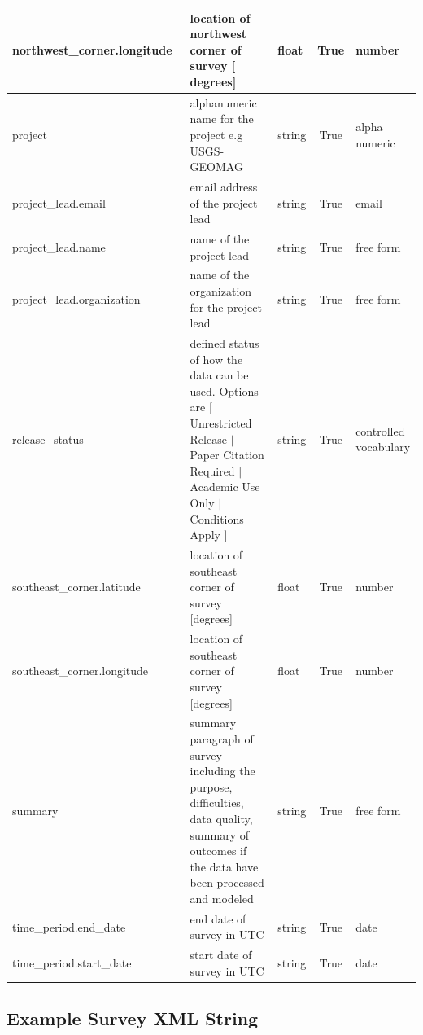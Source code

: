 \documentclass{article}
\begin{document}
\begin{table}[h!]
\begin{tabular}{|l|p{2.75in}|l|c|p{.95in}|}
		northwest\_corner.longitude\ & location of northwest corner of survey [ degrees] & float & True & number \\ \hline
		project & alphanumeric name for the project e.g USGS-GEOMAG & string & True & alpha numeric  \\ \hline
		project\_lead.email & email address of the project lead & string & True & email  \\ \hline
		project\_lead.name & name of the project lead & string & True & free form  \\ \hline
		project\_lead.organization & name of the organization for the project lead & string & True & free form  \\ \hline
		release\_status\ & defined status of how the data can be used. Options are [ Unrestricted Release $|$ Paper Citation Required $|$ Academic Use Only $|$ Conditions Apply ] & string & True & controlled vocabulary \\ \hline
		southeast\_corner.latitude\ & location of southeast corner of survey [degrees] & float & True & number \\ \hline
		southeast\_corner.longitude\ & location of southeast corner of survey [degrees] & float & True & number \\ \hline
		summary\ & summary paragraph of survey including the purpose, difficulties, data quality, summary of outcomes if the data have been processed and modeled & string & True & free form \\ \hline
		time\_period.end\_date\ & end date of survey in UTC & string & True & date  \\ \hline
		time\_period.start\_date\ & start date of survey in UTC & string & True & date \\ \hline
	
	\end{tabular}
	\label{tab:survey}
\end{table} 

\newpage
\subsection{Example Survey XML String}
\end{document}
